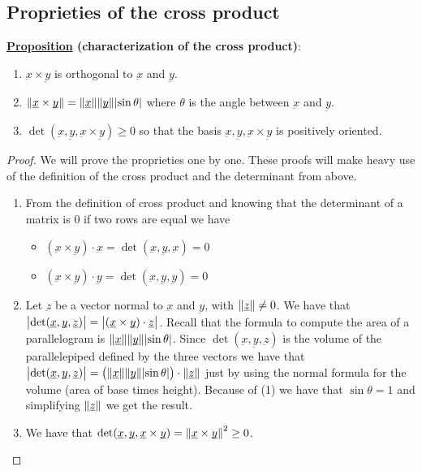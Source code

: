 \documentclass[10pt]{extarticle}
\renewcommand{\vec}[1]{\underbar{\ensuremath{#1}}}
\begin{document}
\subsection{Proprieties of the cross product}

\textbf{\underline{Proposition} (characterization of the cross product)}:

\begin{enumerate}
    \item $\vec{x} \times \vec{y}$ is orthogonal to $\vec{x}$ and $\vec{y}$.
    \item $\norm{\vec{x} \times \vec{y}} = \norm{\vec{x}} \norm {\vec{y}} \abs{\sin \theta}$
          where $\theta$ is the angle between $\vec{x}$ and $\vec{y}$.
    \item $\det (\vec{x}, \vec{y}, \vec{x} \times \vec{y}) \geq 0$
          so that the basis $\vec{x}, \vec{y}, \vec{x} \times \vec{y}$ is positively oriented.
\end{enumerate}

\begin{proof}
    We will prove the proprieties one by one.
    These proofs will make heavy use of the definition of the cross product and the determinant from above.
    \begin{enumerate}
        \item From the definition of cross product and knowing that the determinant of a matrix is 0 if two rows are equal we have
              \begin{itemize}
                  \item $(\vec{x} \times \vec{y}) \cdot \vec{x} = \det (\vec{x}, \vec{y}, \vec{x}) = 0$
                  \item $(\vec{x} \times \vec{y}) \cdot \vec{y} = \det (\vec{x}, \vec{y}, \vec{y}) = 0$
              \end{itemize}
        \item Let $\vec{z}$ be a vector normal to $\vec{x}$ and $\vec{y}$, with $\norm{\vec{z}} \ne 0$.
              We have that $\abs{\det (\vec{x}, \vec{y}, \vec{z})} = \abs{(\vec{x} \times \vec{y}) \cdot \vec{z}}$.
              Recall that the formula to compute the area of a parallelogram is $\norm{\vec{x}} \norm{\vec{y}} \abs{\sin \theta}$.
              Since $\det (\vec{x}, \vec{y}, \vec{z})$ is the volume of the parallelepiped defined by the three vectors we have that
              $\abs{\det (\vec{x}, \vec{y}, \vec{z})} = \left(\norm{\vec{x}} \norm{\vec{y}} \abs{\sin \theta}\right) \cdot \norm{\vec{z}}$ just by using the normal formula for the volume (area of base times height).
              Because of (1) we have that $\sin \theta = 1$ and simplifying $\norm{\vec{z}}$ we get the result.
        \item We have that $\det (\vec{x}, \vec{y}, \vec{x} \times \vec{y}) = \norm{\vec{x} \times \vec{y}}^2 \geq 0$.
    \end{enumerate}
\end{proof}
\end{document}
